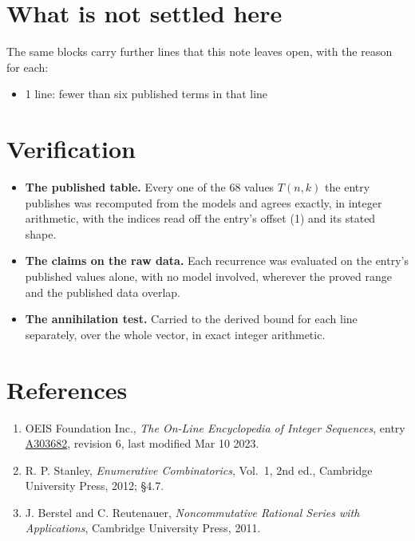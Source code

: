 \documentclass[11pt]{article}
\theoremstyle{definition}
\begin{document}
\section{What is not settled here}

The same blocks carry further lines that this note leaves open, with the reason for each:

\begin{itemize}

\item 1 line: fewer than six published terms in that line

\end{itemize}

\section{Verification}

\begin{itemize}

\item {\bfseries The published table.} Every one of the 68 values $T(n,k)$ the entry publishes was recomputed from the models and agrees exactly, in integer arithmetic, with the indices read off the entry's offset (1) and its stated shape.

\item {\bfseries The claims on the raw data.} Each recurrence was evaluated on the entry's published values alone, with no model involved, wherever the proved range and the published data overlap.

\item {\bfseries The annihilation test.} Carried to the derived bound for each line separately, over the whole vector, in exact integer arithmetic.

\end{itemize}

\section{References}

\begin{enumerate}

\item OEIS Foundation Inc., \emph{The On-Line Encyclopedia of Integer Sequences}, entry \href{https://oeis.org/A303682}{A303682}, revision 6, last modified Mar 10 2023.

\item R. P. Stanley, \emph{Enumerative Combinatorics}, Vol.~1, 2nd ed., Cambridge University Press, 2012; \S4.7.

\item J. Berstel and C. Reutenauer, \emph{Noncommutative Rational Series with Applications}, Cambridge University Press, 2011.

\end{enumerate}
\end{document}
